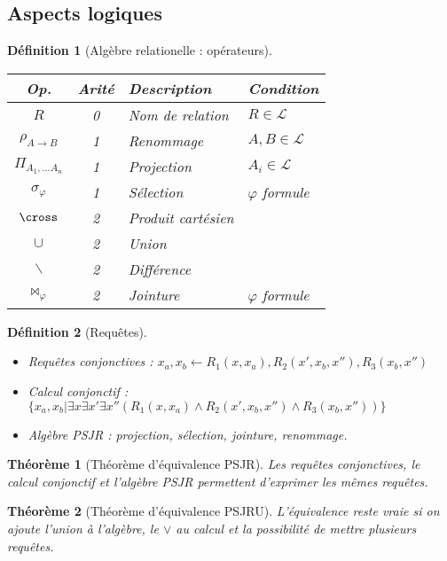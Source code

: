 \documentclass[landscape]{article}
\newcommand{\L}{\mathscr{L}}
\newcommand{\1}{\mathbbm{1}}
\renewcommand{\phi}{\varphi}
\newtheorem{theo}{Théorème}
\newtheorem{defi}{Définition}
\begin{document}
\begin{multicols}{2}
    \section{Aspects logiques}

    \begin{defi}[Algèbre relationelle : opérateurs]
        \begin{tabular}{ccll}
            \hline
            Op. & Arité & Description & Condition \\
            \hline
            $R$ & 0 & Nom de relation & $R \in \L$ \\
            $\rho_{A\rightarrow B}$ & 1 & Renommage & $A,B\in\L$ \\
            $\Pi_{A_1,\ldots A_n}$ & 1 & Projection & $A_i\in\L$ \\
            $\sigma_\phi$ & 1 & Sélection & $\phi$ formule \\
            $\cross$ & 2 & Produit cartésien & \\
            $\cup$ & 2 & Union & \\
            $\backslash$ & 2 & Différence & \\
            $\bowtie_\phi$ & 2 & Jointure & $\phi$ formule \\
            \hline
        \end{tabular}
    \end{defi}

    \begin{defi}[Requêtes] \begin{itemize}
        \item Requêtes conjonctives : $x_a, x_b \leftarrow R_1(x, x_a), R_2(x', x_b, x''), R_3(x_b, x'')$
        \item Calcul conjonctif : $\{x_a, x_b | \exists x \exists x' \exists x''(R_1(x, x_a)\wedge R_2(x', x_b, x'')\wedge R_3(x_b, x'')) \}$
        \item Algèbre PSJR : projection, sélection, jointure, renommage.
    \end{itemize}\end{defi}

    \begin{theo}[Théorème d'équivalence PSJR]
        Les requêtes conjonctives, le calcul conjonctif et l'algèbre PSJR permettent
        d'exprimer les mêmes requêtes.
    \end{theo}

    \begin{theo}[Théorème d'équivalence PSJRU]
        L'équivalence reste vraie si on ajoute l'union à l'algèbre, le $\vee$ au
        calcul et la possibilité de mettre plusieurs requêtes.
    \end{theo}


\end{multicols}
\end{document}
